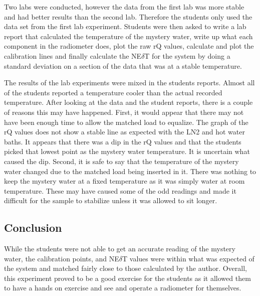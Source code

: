 Two labs were conducted, however the data from the first lab was more stable and had better results than the second lab.  Therefore the students only used the data set from the first lab experiment.  Students were then asked to write a lab report that calculated the temperature of the mystery water, write up what each component in the radiometer does, plot the raw rQ values, calculate and plot the calibration lines and finally calculate the NE$\delta$T for the system by doing a standard deviation on a section of the data that was at a stable temperature.  

The results of the lab experiments were mixed in the students reports.  Almost all of the students reported a temperature cooler than the actual recorded temperature.  After looking at the data and the student reports, there is a couple of reasons this may have happened.  First, it would appear that there may not have been enough time to allow the matched load to equalize.  The graph of the rQ values does not show a stable line as expected with the LN2 and hot water baths.  It appears that there was a dip in the rQ values and that the students picked that lowest point as the mystery water temperature.  It is uncertain what caused the dip.  Second, it is safe to say that the temperature of the mystery water changed due to the matched load being inserted in it.  There was nothing to keep the mystery water at a fixed temperature as it was simply water at room temperature.  These may have caused some of the odd readings and made it difficult for the sample to stabilize unless it was allowed to sit longer.

\subsection{Conclusion}
While the students were not able to get an accurate reading of the mystery water, the calibration points, and NE$\delta$T values were within what was expected of the system and matched fairly close to those calculated by the author.  Overall, this experiment proved to be a good exercise for the students as it allowed them to have a hands on exercise and see and operate a radiometer for themselves.   
